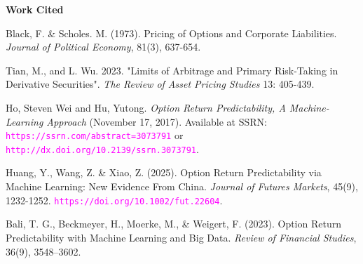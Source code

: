 \documentclass[oneside, 12pt]{article}
\newcommand*{\1}{\text{\scalebox{1.1}{\usefont{U}{bbold}{m}{n}1}}}
\begin{document}
\newpage

\begin{center}
\textbf{Work Cited}
\end{center}
Black, F. \& Scholes. M. (1973). Pricing of Options and Corporate Liabilities. \textit{Journal of Political Economy}, 81(3), 637-654. \newline

Tian, M., and L. Wu. 2023. "Limits of Arbitrage and Primary Risk-Taking in Derivative Securities". \textit{The Review of Asset Pricing Studies} 13: 405-439. \newline

Ho, Steven Wei and Hu, Yutong. \textit{Option Return Predictability, A Machine-Learning Approach} (November 17, 2017). Available at SSRN: \textcolor{magenta}{\texttt{https://ssrn.com/abstract=3073791}} or \newline \textcolor{magenta}{\texttt{http://dx.doi.org/10.2139/ssrn.3073791}}. \newline

Huang, Y., Wang, Z. \& Xiao, Z. (2025). Option Return Predictability via Machine Learning: New Evidence From China. \textit{Journal of Futures Markets}, 45(9), 1232-1252. \newline \textcolor{magenta}{\texttt{https://doi.org/10.1002/fut.22604}}. \newline

Bali, T. G., Beckmeyer, H., Moerke, M., \& Weigert, F. (2023). Option Return Predictability with Machine Learning and Big Data. \textit{Review of Financial Studies}, 36(9), 3548–3602.
\end{document}
